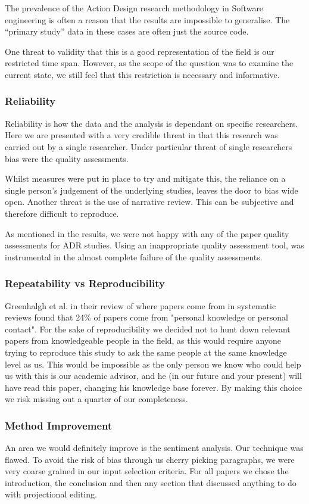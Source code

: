 The prevalence of the Action Design research methodology in Software engineering is often a reason that the results are impossible to generalise.
The ``primary study'' data in these cases are often just the source code.

One threat to validity that this is a good representation of the field is our restricted time span.
However, as the scope of the question was to examine the current state, we still feel that this restriction is necessary and informative.

\subsubsection{Reliability}
Reliability is how the data and the analysis is dependant on specific researchers.
Here we are presented with a very credible threat in that this research was carried out by a single researcher.
Under particular threat of single researchers bias were the quality assessments. 

Whilst measures were put in place to try and mitigate this, the reliance on a single person's judgement of the underlying studies, leaves the door to bias wide open.
Another threat is the use of narrative review. 
This can be subjective and therefore difficult to reproduce.

As mentioned in the results, we were not happy with any of the paper quality assessments for ADR studies.
Using an inappropriate quality assessment tool, was instrumental in the almost complete failure of the quality assessments.


\subsubsection{Repeatability vs Reproducibility}
Greenhalgh et al.\cite{GreenhalghTrisha2005Eaeo} in their review of where papers come from in systematic reviews found that 24\% of papers come from "personal knowledge or personal contact".
For the sake of reproducibility we decided not to hunt down relevant papers from knowledgeable people in the field, as this would require anyone trying to reproduce this study to ask the same people at the same knowledge level as us.
This would be impossible as the only person we know who could help us with this is our academic advisor, and he (in our future and your present) will have read this paper, changing his knowledge base forever.
By making this choice we risk missing out a quarter of our completeness.

\subsubsection{Method Improvement}
An area we would definitely improve is the sentiment analysis.
Our technique was flawed.
To avoid the risk of bias through us cherry picking paragraphs, we were very coarse grained in our input selection criteria.
For all papers we chose the introduction, the conclusion and then any section that discussed anything to do with projectional editing.

